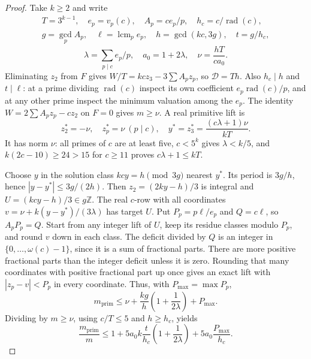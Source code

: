 \documentclass[11pt,a4paper]{article}
\theoremstyle{definition}\newtheorem{question}[theorem]{Question}
\theoremstyle{remark}\newtheorem{remark}[theorem]{Remark}
\newcommand{\Z}{\mathbb Z}\newcommand{\R}{\mathbb R}
\newcommand{\Dgen}{\mathcal D}\newcommand{\mpr}{m_{\mathrm{prim}}}
\DeclareMathOperator{\rad}{rad}\DeclareMathOperator{\supp}{supp}
\DeclareMathOperator{\lcm}{lcm}\DeclareMathOperator{\ord}{ord}
\begin{document}
\begin{proof}
Take $k\ge2$ and write
\[
 \begin{gathered}
 T=3^{k-1},\quad e_p=v_p(c),\quad A_p=ce_p/p,\quad h_c=c/\rad(c),\\
 g=\gcd_p A_p,\quad\ell=\lcm_p e_p,\quad h=\gcd(kc,3g),\quad t=g/h_c,
 \end{gathered}
\]
\[
 \lambda=\sum_{p\mid c}e_p/p,\quad a_0=1+2\lambda,\quad
 \nu=\frac{hT}{ca_0}.
\]
Eliminating $z_2$ from $F$ gives
$W/T=kc z_3-3\sum A_pz_p$, so $\Dgen=Th$.
Also $h_c\mid h$ and $t\mid\ell$: at a prime dividing $\rad(c)$
inspect its own coefficient $e_p\rad(c)/p$, and at any other prime
inspect the minimum valuation among the $e_p$.
The identity $W=2\sum A_pz_p-cz_2$ on $F=0$ gives $m\ge\nu$.
A real primitive lift is
\[
 z_2^*=-\nu,\quad z_p^*=\nu\ (p\mid c),\quad
 y^*=z_3^*=\frac{(c\lambda+1)\nu}{kT}.
\]
It has norm $\nu$: all primes of $c$ are at least five,
$c<5^k$ gives $\lambda<k/5$, and
$k(2c-10)\ge24>15$ for $c\ge11$ proves $c\lambda+1\le kT$.

Choose $y$ in the solution class $kcy=h\pmod{3g}$ nearest $y^*$.
Its period is $3g/h$, hence $|y-y^*|\le3g/(2h)$.
Then $z_2=(2ky-h)/3$ is integral and
$U=(kcy-h)/3\in g\Z$.
The real $c$-row with all coordinates
$v=\nu+k(y-y^*)/(3\lambda)$ has target $U$.
Put $P_p=p\ell/e_p$ and $Q=c\ell$, so $A_pP_p=Q$.
Start from any integer lift of $U$, keep its residue classes modulo
$P_p$, and round $v$ down in each class.
The deficit divided by $Q$ is an integer in
$\{0,\ldots,\omega(c)-1\}$, since it is a sum of fractional parts.
There are more positive fractional parts than the integer deficit unless it is zero.
Rounding that many coordinates with positive fractional part up once gives an exact lift with
$|z_p-v|<P_p$ in every coordinate. Thus, with $P_{\max}=\max P_p$,
\[
 \mpr\le\nu+\frac{kg}{h}\left(1+\frac1{2\lambda}\right)+P_{\max}.
\]
Dividing by $m\ge\nu$, using $c/T\le5$ and $h\ge h_c$, yields
\begin{equation}\label{eq:fixed-error}
 \frac{\mpr}{m}\le1+5a_0k\frac{t}{h_c}
              \left(1+\frac1{2\lambda}\right)
              +5a_0\frac{P_{\max}}{h_c}.
\end{equation}


\end{proof}
\end{document}
